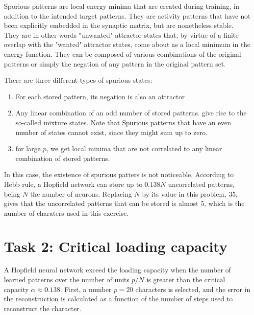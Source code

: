 \documentclass[10pt]{article}
\begin{document}
\begin{multicols}{2}
  Sporious patterns are local energy minima that are created during
  training, in addition to the intended target patterns. They are
  activity patterns that have not been explicitly embedded in the
  synaptic matrix, but are nonetheless stable. They are in other
  words "unwanted" attractor states that, by virtue of a finite
  overlap with the "wanted" attractor states, come about as a
  local minimum in the energy function. They can be composed of
  various combinations of the original patterns or simply the
  negation of any pattern in the original pattern set.

  There are three different types of spurious states:

  \begin{enumerate}
  \item For each stored pattern, its negation is also an attractor
  \item Any linear combination of an odd number of stored patterns.
    give rise to the so-called mixture states. Note that Spurious
    patterns that have an even number of states cannot exist, since they might sum up to zero.
  \item for large $p$, we get local minima that are not correlated to
    any linear combination of stored patterns.
  \end{enumerate}

  In this case, the existence of spurious patters is not noticeable.
  According to Hebb rule, a Hopfield network can store up to $0.138N$
  uncorrelated patterns, being $N$ the number of neurons. Replacing
  $N$ by its value in this problem, 35, gives that the uncorrelated
  patterns that can be stored is almost 5, which is the number of
  charaters used in this exercise.

  \section*{Task 2: Critical loading capacity}
  A Hopfield neural network exceed the loading capacity when the number of
  learned patterns over the number of units $p/N$ is greater than the critical
  capacity $\alpha \approx 0.138$.
  First, a number $p = 20$ characters is selected, and the error in the
  reconstruction is calculated as a function of the number of steps used
  to reconstruct the character.


\end{multicols}
\end{document}
